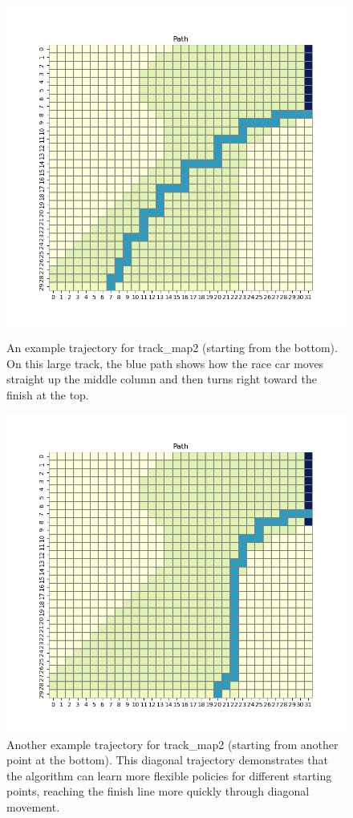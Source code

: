 \documentclass{article}
\begin{document}
\begin{figure}[h]
    \centering
    \begin{minipage}{0.48\textwidth}
        \includegraphics[width=\textwidth]{grid2_3.png}
        \caption{An example trajectory for track\_map2 (starting from the bottom). On this large track, the blue path shows how the race car moves straight up the middle column and then turns right toward the finish at the top.}
    \end{minipage}
    \hfill
    \begin{minipage}{0.48\textwidth}
        \includegraphics[width=\textwidth]{grid2_4.png}
        \caption{Another example trajectory for track\_map2 (starting from another point at the bottom). This diagonal trajectory demonstrates that the algorithm can learn more flexible policies for different starting points, reaching the finish line more quickly through diagonal movement.}
    \end{minipage}
\end{figure}
\end{document}
